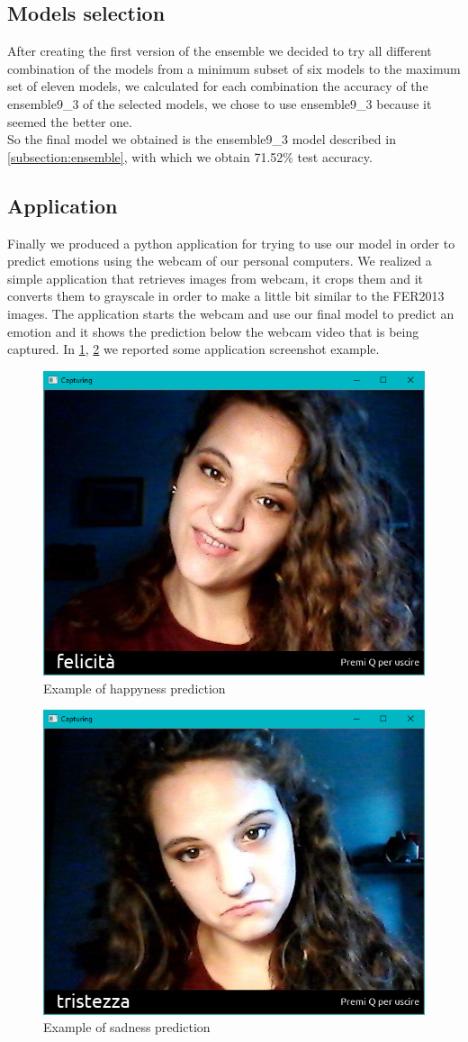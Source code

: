 \documentclass[10pt,twocolumn,letterpaper]{article}
\begin{document}
\subsection{Models selection}
After creating the first version of the ensemble we decided to try all different combination of the models from a minimum subset of six models to the maximum set of eleven models, we calculated for each combination the accuracy of the ensemble9\_3 of the selected models, we chose to use ensemble9\_3 because it seemed the better one. 
\\So the final model we obtained is the ensemble9\_3 model described in \ref{subsection:ensemble}, with which we obtain 71.52\% test accuracy.
\subsection{Application}
Finally we produced a python application for trying to use our model in order to predict emotions using the webcam of our personal computers.
We realized a simple application that retrieves images from webcam, it crops them and it converts them to grayscale in order to make a little bit similar to the FER2013 images.
The application starts the webcam and use our final model to predict an emotion and it shows the prediction below the webcam video that is being captured. In \ref{figure:ele1}, \ref{figure:ele2} we reported some application screenshot example.

\begin{figure}[H]
   \centering
   \includegraphics[width=0.4\linewidth]{./immagini/ele_felice.png}
   \caption{Example of happyness prediction}
   \label{figure:ele1}
\end{figure}

\begin{figure}[H]
   \centering
   \includegraphics[width=0.4\linewidth]{./immagini/ele_triste.png}
   \caption{Example of sadness prediction}
   \label{figure:ele2}
\end{figure}
\end{document}
